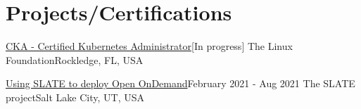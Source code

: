 \section{Projects/Certifications}
\mySubHeadingListStart

  \mySubHeading
  {\href{https://training.linuxfoundation.org}{\textcolor{linkcolor}{CKA - Certified Kubernetes Administrator}}}{[In progress]}
  {The Linux Foundation}{Rockledge, FL, USA}
  \hfill

  \mySubHeading
  {\href{https://slateci.io/blog/slate-open-ondemand.html}{\textcolor{linkcolor}{Using SLATE to deploy Open OnDemand}}}{February 2021 - Aug 2021}
  {The SLATE project}{Salt Lake City, UT, USA}
  \myItemListStart
  \myItemListEnd

\mySubHeadingListEnd

